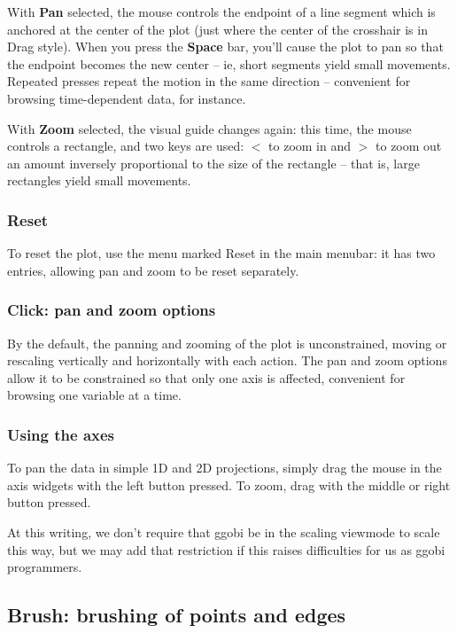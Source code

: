 \documentclass[11pt]{article}
\begin{document}
With {\bf Pan} selected, the mouse controls the endpoint of a line
segment which is anchored at the center of the plot (just where the
center of the crosshair is in Drag style).  When you press the {\bf
Space} bar, you'll cause the plot to pan so that the endpoint becomes
the new center -- ie, short segments yield small movements.  Repeated
presses repeat the motion in the same direction -- convenient for
browsing time-dependent data, for instance.

With {\bf Zoom} selected, the visual guide changes again: this time,
the mouse controls a rectangle, and two keys are used: {\boldmath $<$}
to zoom in and {\boldmath $>$} to zoom out an amount inversely
proportional to the size of the rectangle -- that is, large rectangles
yield small movements.

\subsubsection{Reset}

To reset the plot, use the menu marked Reset in the main menubar:
it has two entries, allowing pan and zoom to be reset separately.

\subsubsection{Click: pan and zoom options}

By the default, the panning and zooming of the plot is unconstrained,
moving or rescaling vertically and horizontally with each action.
The pan and zoom options allow it to be constrained so that only
one axis is affected, convenient for browsing one variable at a time.

\subsubsection{Using the axes}

To pan the data in simple 1D and 2D projections, simply drag the mouse
in the axis widgets with the left button pressed.  To zoom, drag with
the middle or right button pressed.

At this writing, we don't require that ggobi be in the scaling viewmode to
scale this way, but we may add that restriction if this raises 
difficulties for us as ggobi programmers.

\subsection{Brush: brushing of points and edges}
\label{slbl:Brush}
\end{document}
